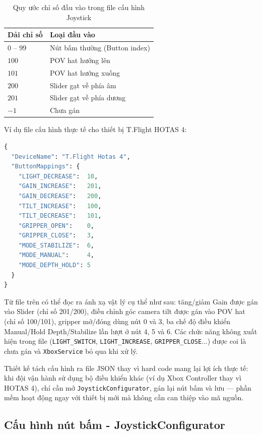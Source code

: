 \documentclass[../DoAn.tex]{subfiles}
\begin{document}
\begin{table}[H]
\centering
\renewcommand{\arraystretch}{1.3}
\begin{tabular}{|l|l|}
\hline
\textbf{Dải chỉ số} & \textbf{Loại đầu vào} \\
\hline
$0$ -- $99$  & Nút bấm thường (Button index) \\
$100$        & POV hat hướng lên \\
$101$        & POV hat hướng xuống \\
$200$        & Slider gạt về phía âm \\
$201$        & Slider gạt về phía dương \\
$-1$         & Chưa gán \\
\hline
\end{tabular}
\caption{Quy ước chỉ số đầu vào trong file cấu hình Joystick}
\label{tab:joystick_index}
\end{table}

Ví dụ file cấu hình thực tế cho thiết bị T.Flight HOTAS 4:

\begin{lstlisting}[language=Python, caption={File Xbox\_config.json cho T.Flight HOTAS 4}, label={lst:joystick_config}]
{
  "DeviceName": "T.Flight Hotas 4",
  "ButtonMappings": {
    "LIGHT_DECREASE":  10,
    "GAIN_INCREASE":   201,
    "GAIN_DECREASE":   200,
    "TILT_INCREASE":   100,
    "TILT_DECREASE":   101,
    "GRIPPER_OPEN":    0,
    "GRIPPER_CLOSE":   3,
    "MODE_STABILIZE":  6,
    "MODE_MANUAL":     4,
    "MODE_DEPTH_HOLD": 5
  }
}
\end{lstlisting}

Từ file trên có thể đọc ra ánh xạ vật lý cụ thể như sau: tăng/giảm
Gain được gán vào Slider (chỉ số 201/200), điều chỉnh góc camera
tilt được gán vào POV hat (chỉ số 100/101), gripper mở/đóng dùng
nút 0 và 3, ba chế độ điều khiển Manual/Hold Depth/Stabilize lần
lượt ở nút 4, 5 và 6. Các chức năng không xuất hiện trong file
(\texttt{LIGHT\_SWITCH}, \texttt{LIGHT\_INCREASE}, \texttt{GRIPPER\_CLOSE}...)
được coi là chưa gán và \texttt{XboxService} bỏ qua khi xử lý.

Thiết kế tách cấu hình ra file JSON thay vì hard code mang lại lợi
ích thực tế: khi đội vận hành sử dụng bộ điều khiển khác (ví dụ
Xbox Controller thay vì HOTAS 4), chỉ cần mở \texttt{JoystickConfigurator},
gán lại nút bấm và lưu --- phần mềm hoạt động ngay với thiết bị mới
mà không cần can thiệp vào mã nguồn.

\subsection{Cấu hình nút bấm - JoystickConfigurator}
\end{document}
